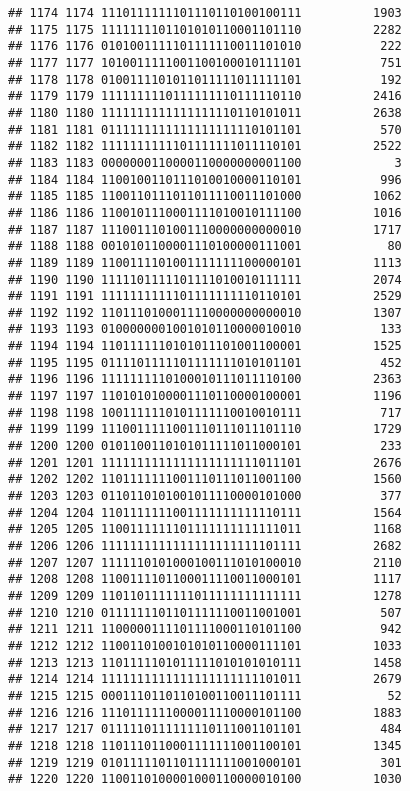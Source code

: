 \documentclass[]{article}
\begin{document}
\begin{verbatim}
## 1174 1174 1110111111101110110100100111          1903
## 1175 1175 1111111101101010110001101110          2282
## 1176 1176 0101001111101111110011101010           222
## 1177 1177 1010011111001100100010111101           751
## 1178 1178 0100111101011011111011111101           192
## 1179 1179 1111111110111111110111110110          2416
## 1180 1180 1111111111111111110110101011          2638
## 1181 1181 0111111111111111111110101101           570
## 1182 1182 1111111111101111111011110101          2522
## 1183 1183 0000000110000110000000001100             3
## 1184 1184 1100100110111010010000110101           996
## 1185 1185 1100110111011011110011101000          1062
## 1186 1186 1100101110001111010010111100          1016
## 1187 1187 1110011101001110000000000010          1717
## 1188 1188 0010101100001110100000111001            80
## 1189 1189 1100111101001111111100000101          1113
## 1190 1190 1111101111101111010010111111          2074
## 1191 1191 1111111111101111111110110101          2529
## 1192 1192 1101110100011110000000000010          1307
## 1193 1193 0100000001001010110000010010           133
## 1194 1194 1101111110101011101001100001          1525
## 1195 1195 0111101111101111111010101101           452
## 1196 1196 1111111110100010111011110100          2363
## 1197 1197 1101010100001110110000100001          1196
## 1198 1198 1001111110101111110010010111           717
## 1199 1199 1110011111001110111011101110          1729
## 1200 1200 0101100110101011111011000101           233
## 1201 1201 1111111111111111111111011101          2676
## 1202 1202 1101111111001110111011001100          1560
## 1203 1203 0110110101001011110000101000           377
## 1204 1204 1101111111001111111111110111          1564
## 1205 1205 1100111111101111111111111011          1168
## 1206 1206 1111111111111111111111101111          2682
## 1207 1207 1111110101000100111010100010          2110
## 1208 1208 1100111101100011110011000101          1117
## 1209 1209 1101101111111011111111111111          1278
## 1210 1210 0111111101101111110011001001           507
## 1211 1211 1100000111101111000110101100           942
## 1212 1212 1100110100101010110000111101          1033
## 1213 1213 1101111101011111010101010111          1458
## 1214 1214 1111111111111111111111101011          2679
## 1215 1215 0001110110110100110011101111            52
## 1216 1216 1110111111000011110000101100          1883
## 1217 1217 0111110111111110111001101101           484
## 1218 1218 1101110110001111111001100101          1345
## 1219 1219 0101111101101111111001000101           301
## 1220 1220 1100110100001000110000010100          1030

\end{verbatim}
\end{document}
